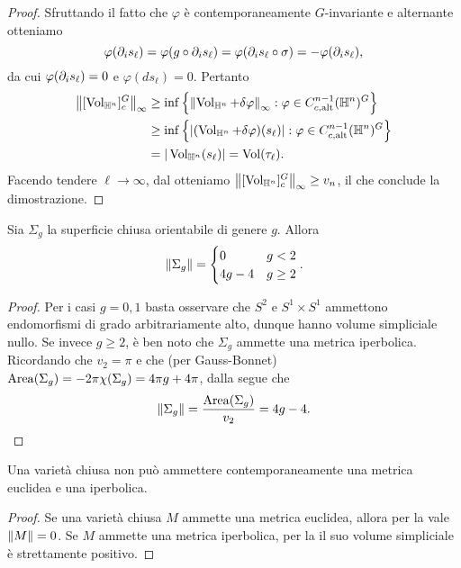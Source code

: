 \begin{proof}
Sfruttando il fatto che $\varphi$ è contemporaneamente $G$-invariante e alternante otteniamo
\[
\varphi(\partial_i s_\ell)=\varphi(g\circ\partial_i s_\ell)=\varphi(\partial_i s_\ell\circ\sigma)=-\varphi(\partial_i s_\ell),
\]
da cui $\varphi(\partial_i s_\ell)=0$ e $\varphi(ds_\ell)=0$. Pertanto
\begin{align*}
\left\lVert [\operatorname{Vol}_{\mathbb{H}^n}]^G_c\right\rVert_\infty&\ge\inf\left\{\left\lVert \operatorname{Vol}_{\mathbb{H}^n}+\delta\varphi\right\rVert_\infty:\varphi\in C^{n-1}_{c,\operatorname{alt}}(\mathbb{H}^n)^G\right\}\\
&\ge\inf\left\{|(\operatorname{Vol}_{\mathbb{H}^n}+\delta\varphi)(s_\ell)|:\varphi\in C^{n-1}_{c,\operatorname{alt}}(\mathbb{H}^n)^G\right\}\\
&=|\operatorname{Vol}_{\mathbb{H}^n}(s_\ell)|=\operatorname{Vol}(\tau_\ell).
\end{align*}
Facendo tendere $\ell\to\infty$, dal  otteniamo $\left\lVert [\operatorname{Vol}_{\mathbb{H}^n}]^G_c\right\rVert_{\infty}\ge v_n$, il che conclude la dimostrazione.
\end{proof}

\begin{corollary}
Sia $\Sigma_g$ la superficie chiusa orientabile di genere $g$. Allora
\[
\left\lVert \Sigma_g\right\rVert=
\begin{cases}
0&g<2\\
4g-4&g\ge 2
\end{cases}.
\]
\end{corollary}
\begin{proof}
Per i casi $g=0,1$ basta osservare che $S^2$ e $S^1\times S^1$ ammettono endomorfismi di grado arbitrariamente alto, dunque hanno volume simpliciale nullo. Se invece $g\ge2$, è ben noto che $\Sigma_g$ ammette una metrica iperbolica. Ricordando che $v_2=\pi$ e che (per Gauss-Bonnet) $\operatorname{Area}(\Sigma_g)=-2\pi\chi(\Sigma_g)=4\pi g+4\pi$, dalla  segue che
\[
\left\lVert \Sigma_g\right\rVert=\frac{\operatorname{Area}(\Sigma_g)}{v_2}=4g-4.\qedhere
\]
\end{proof}

\begin{corollary}
Una varietà chiusa non può ammettere contemporaneamente una metrica euclidea e una iperbolica.
\end{corollary}
\begin{proof}
Se una varietà chiusa $M$ ammette una metrica euclidea, allora per la  vale $\left\lVert M\right\rVert=0$. Se $M$ ammette una metrica iperbolica, per la   il suo volume simpliciale è strettamente positivo.
\end{proof}
